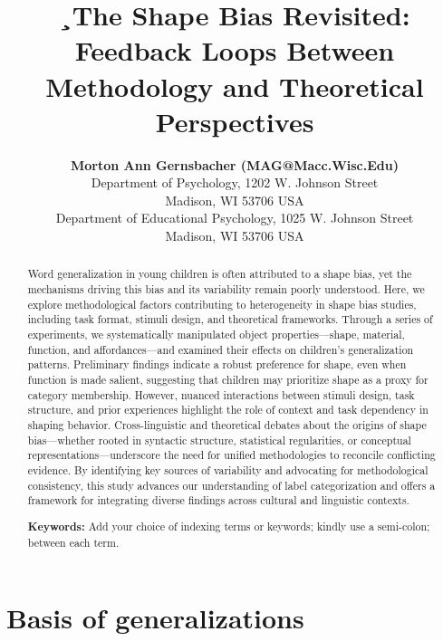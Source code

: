 \documentclass[10pt, letterpaper]{article}
\title{¸The Shape Bias Revisited: Feedback Loops Between Methodology and
Theoretical Perspectives}
\author{{\large \bf Morton Ann Gernsbacher (MAG@Macc.Wisc.Edu)} \\ Department of Psychology, 1202 W. Johnson Street \\ Madison, WI 53706 USA \AND {\large \bf Sharon J.~Derry (SDJ@Macc.Wisc.Edu)} \\ Department of Educational Psychology, 1025 W. Johnson Street \\ Madison, WI 53706 USA}
\begin{document}
\maketitle

\begin{abstract}
Word generalization in young children is often attributed to a shape
bias, yet the mechanisms driving this bias and its variability remain
poorly understood. Here, we explore methodological factors contributing
to heterogeneity in shape bias studies, including task format, stimuli
design, and theoretical frameworks. Through a series of experiments, we
systematically manipulated object properties---shape, material,
function, and affordances---and examined their effects on children's
generalization patterns. Preliminary findings indicate a robust
preference for shape, even when function is made salient, suggesting
that children may prioritize shape as a proxy for category membership.
However, nuanced interactions between stimuli design, task structure,
and prior experiences highlight the role of context and task dependency
in shaping behavior. Cross-linguistic and theoretical debates about the
origins of shape bias---whether rooted in syntactic structure,
statistical regularities, or conceptual representations---underscore the
need for unified methodologies to reconcile conflicting evidence. By
identifying key sources of variability and advocating for methodological
consistency, this study advances our understanding of label
categorization and offers a framework for integrating diverse findings
across cultural and linguistic contexts.

\textbf{Keywords:}
Add your choice of indexing terms or keywords; kindly use a semi-colon;
between each term.
\end{abstract}

\hypertarget{basis-of-generalizations}{%
\section{Basis of generalizations}\label{basis-of-generalizations}}
\end{document}
